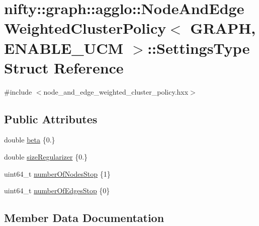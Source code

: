 \hypertarget{structnifty_1_1graph_1_1agglo_1_1NodeAndEdgeWeightedClusterPolicy_1_1SettingsType}{}\section{nifty\+:\+:graph\+:\+:agglo\+:\+:Node\+And\+Edge\+Weighted\+Cluster\+Policy$<$ G\+R\+A\+PH, E\+N\+A\+B\+L\+E\+\_\+\+U\+CM $>$\+:\+:Settings\+Type Struct Reference}
\label{structnifty_1_1graph_1_1agglo_1_1NodeAndEdgeWeightedClusterPolicy_1_1SettingsType}


{\ttfamily \#include $<$node\+\_\+and\+\_\+edge\+\_\+weighted\+\_\+cluster\+\_\+policy.\+hxx$>$}

\subsection*{Public Attributes}
\begin{DoxyCompactItemize}
\item 
double \hyperlink{structnifty_1_1graph_1_1agglo_1_1NodeAndEdgeWeightedClusterPolicy_1_1SettingsType_a9f7f74df89ee2f84bbd2537a7cd783bd}{beta} \{0.\}
\item 
double \hyperlink{structnifty_1_1graph_1_1agglo_1_1NodeAndEdgeWeightedClusterPolicy_1_1SettingsType_aca88c9142fbe9a8789c52042136f7726}{size\+Regularizer} \{0.\}
\item 
uint64\+\_\+t \hyperlink{structnifty_1_1graph_1_1agglo_1_1NodeAndEdgeWeightedClusterPolicy_1_1SettingsType_aee8176a814f59a05d6919b419c1bd16d}{number\+Of\+Nodes\+Stop} \{1\}
\item 
uint64\+\_\+t \hyperlink{structnifty_1_1graph_1_1agglo_1_1NodeAndEdgeWeightedClusterPolicy_1_1SettingsType_a881c642ddc8b43c494c24df3292ef8a1}{number\+Of\+Edges\+Stop} \{0\}
\end{DoxyCompactItemize}


\subsection{Member Data Documentation}
\mbox{\label{structnifty_1_1graph_1_1agglo_1_1NodeAndEdgeWeightedClusterPolicy_1_1SettingsType_a9f7f74df89ee2f84bbd2537a7cd783bd}} 
